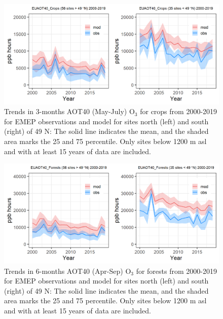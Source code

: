 \begin{figure}
	\centering
	\includegraphics[width=0.74\paperwidth]{FIGS_TRENDS/EUAOT40_Crops_2000_2019_1200m.png}
	\caption{\label{fig:O3_aot40croptrends} Trends in 3-months AOT40 (May-July) O$_3$ for crops from 2000-2019 for EMEP observations and model for sites north (left) and south (right) of 49 N: The solid line indicates the mean, and the shaded area marks the 25 and 75 percentile. Only sites below 1200 m asl and with at least 15 years of data are included.}
\end{figure}

\begin{figure}
	\centering
	\includegraphics[width=0.74\paperwidth]{FIGS_TRENDS/EUAOT40_Forests_2000_2019_1200m.png}
	\caption{\label{fig:O3_aot40foresttrends}Trends in 6-months AOT40 (Apr-Sep) O$_3$ for forests from 2000-2019 for EMEP observations and model for sites north (left) and south (right) of 49 N: The solid line indicates the mean, and the shaded area marks the 25 and 75 percentile. Only sites below 1200 m asl and with at least 15 years of data are included.}
\end{figure}

